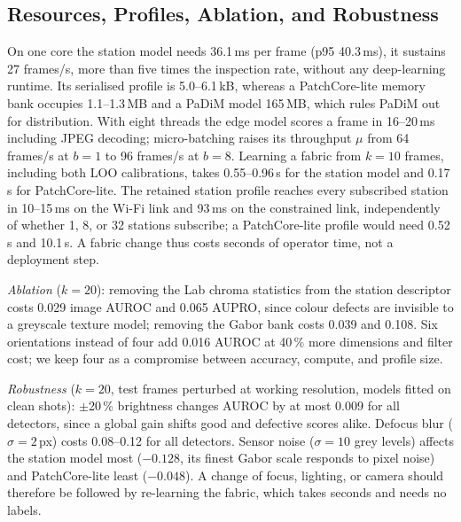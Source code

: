 \subsection{Resources, Profiles, Ablation, and Robustness}\label{sec:res-resources}
On one core the station model needs 36.1\,ms per frame (p95 40.3\,ms), \ie it sustains 27 frames/s, more than five times the inspection rate, without any deep-learning runtime. Its serialised profile is 5.0--6.1\,kB, whereas a PatchCore-lite memory bank occupies 1.1--1.3\,MB and a PaDiM model 165\,MB, which rules PaDiM out for distribution. With eight threads the edge model scores a frame in 16--20\,ms including JPEG decoding; micro-batching raises its throughput $\mu$ from 64 frames/s at $b=1$ to 96 frames/s at $b=8$. Learning a fabric from $k=10$ frames, including both LOO calibrations, takes 0.55--0.96\,s for the station model and 0.17\,s for PatchCore-lite. The retained station profile reaches every subscribed station in 10--15\,ms on the Wi-Fi link and 93\,ms on the constrained link, independently of whether 1, 8, or 32 stations subscribe; a PatchCore-lite profile would need 0.52\,s and 10.1\,s. A fabric change thus costs seconds of operator time, not a deployment step.

\emph{Ablation} ($k=20$): removing the Lab chroma statistics from the station descriptor costs 0.029 image AUROC and 0.065 AUPRO, since colour defects are invisible to a greyscale texture model; removing the Gabor bank costs 0.039 and 0.108. Six orientations instead of four add 0.016 AUROC at 40\,\% more dimensions and filter cost; we keep four as a compromise between accuracy, compute, and profile size.

\emph{Robustness} ($k=20$, test frames perturbed at working resolution, models fitted on clean shots): $\pm$20\,\% brightness changes AUROC by at most 0.009 for all detectors, since a global gain shifts good and defective scores alike. Defocus blur ($\sigma=2$\,px) costs 0.08--0.12 for all detectors. Sensor noise ($\sigma=10$ grey levels) affects the station model most ($-0.128$, its finest Gabor scale responds to pixel noise) and PatchCore-lite least ($-0.048$). A change of focus, lighting, or camera should therefore be followed by re-learning the fabric, which takes seconds and needs no labels.
